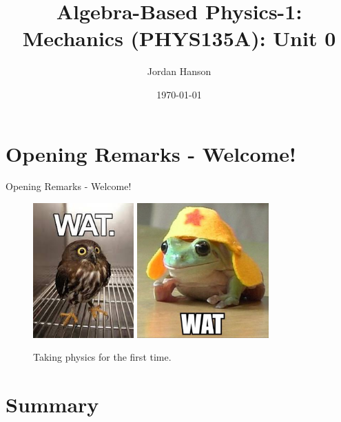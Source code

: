 \documentclass{beamer}
\title{Algebra-Based Physics-1: Mechanics (PHYS135A): Unit 0}
\date{\today}
\author{Jordan Hanson}
\institute{Whittier College Department of Physics and Astronomy}
\begin{document}
\maketitle

\section{Opening Remarks - Welcome!}

\begin{frame}{Opening Remarks - Welcome!}
\small
\begin{figure}
\centering
\includegraphics[width=0.345\textwidth]{../../watowl.jpeg}
\includegraphics[width=0.45\textwidth]{../../frogs-know-wats.png}
\caption{\label{fig:wat1} Taking physics for the first time.}
\end{figure}
\end{frame}

\section{Summary}
\end{document}
